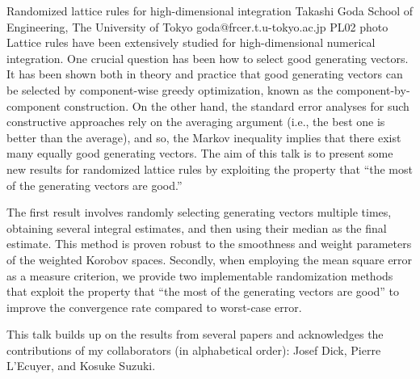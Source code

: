 \documentclass[12pt,a4paper,figuresright]{book}
\begin{document}
\clearpage

\begin{talk}
	{Randomized lattice rules for high-dimensional integration}%
	{Takashi Goda}%
	{School of Engineering, The University of Tokyo}%
	{goda@frcer.t.u-tokyo.ac.jp}%
	{}%
	{}%
	{}%
	{PL02}%
	{photo}%
	Lattice rules have been extensively studied for high-dimensional numerical integration. One crucial question has been how to select good generating vectors. It has been shown both in theory and practice that good generating vectors can be selected by component-wise greedy optimization, known as the component-by-component construction. On the other hand, the standard error analyses for such constructive approaches rely on the averaging argument (i.e., the best one is better than the average), and so, the Markov inequality implies that there exist many equally good generating vectors. The aim of this talk is to present some new results for randomized lattice rules by exploiting the property that ``the most of the generating vectors are good.''

The first result involves randomly selecting generating vectors multiple times, obtaining several integral estimates, and then using their median as the final estimate. This method is proven robust to the smoothness and weight parameters of the weighted Korobov spaces. Secondly, when employing the mean square error as a measure criterion, we provide two implementable randomization methods that exploit the property that ``the most of the generating vectors are good'' to improve the convergence rate compared to worst-case error.

This talk builds up on the results from several papers and acknowledges the contributions of my collaborators (in alphabetical order): Josef Dick, Pierre L'Ecuyer, and Kosuke Suzuki.
\end{talk}

\clearpage
\end{document}
